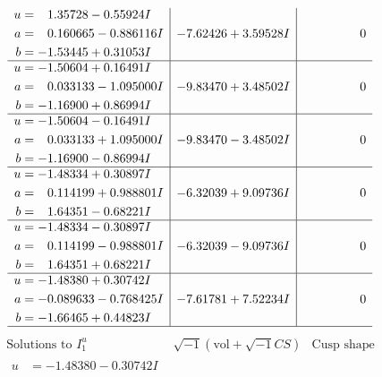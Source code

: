 \documentclass[1p]{elsarticle_modified}
\theoremstyle{definition}
\newcommand{\I}{\sqrt{-1}}
\begin{document}
$$\begin{array}{c|c|c}
\begin{aligned}
u &= \phantom{-}1.35728 - 0.55924 I \\
a &= \phantom{-}0.160665 - 0.886116 I \\
b &= -1.53445 + 0.31053 I\end{aligned}
 & -7.62426 + 3.59528 I & \phantom{-0.000000 } 0 \\ \hline\begin{aligned}
u &= -1.50604 + 0.16491 I \\
a &= \phantom{-}0.033133 - 1.095000 I \\
b &= -1.16900 + 0.86994 I\end{aligned}
 & -9.83470 + 3.48502 I & \phantom{-0.000000 } 0 \\ \hline\begin{aligned}
u &= -1.50604 - 0.16491 I \\
a &= \phantom{-}0.033133 + 1.095000 I \\
b &= -1.16900 - 0.86994 I\end{aligned}
 & -9.83470 - 3.48502 I & \phantom{-0.000000 } 0 \\ \hline\begin{aligned}
u &= -1.48334 + 0.30897 I \\
a &= \phantom{-}0.114199 + 0.988801 I \\
b &= \phantom{-}1.64351 - 0.68221 I\end{aligned}
 & -6.32039 + 9.09736 I & \phantom{-0.000000 } 0 \\ \hline\begin{aligned}
u &= -1.48334 - 0.30897 I \\
a &= \phantom{-}0.114199 - 0.988801 I \\
b &= \phantom{-}1.64351 + 0.68221 I\end{aligned}
 & -6.32039 - 9.09736 I & \phantom{-0.000000 } 0 \\ \hline\begin{aligned}
u &= -1.48380 + 0.30742 I \\
a &= -0.089633 - 0.768425 I \\
b &= -1.66465 + 0.44823 I\end{aligned}
 & -7.61781 + 7.52234 I & \phantom{-0.000000 } 0\\
 \hline 
 \end{array}$$\newpage$$\begin{array}{c|c|c}  
\text{Solutions to }I^u_{1}& \I (\text{vol} + \sqrt{-1}CS) & \text{Cusp shape}\\
 \hline 
\begin{aligned}
u &= -1.48380 - 0.30742 I \\

\end{aligned}
\end{array}$$
\end{document}
